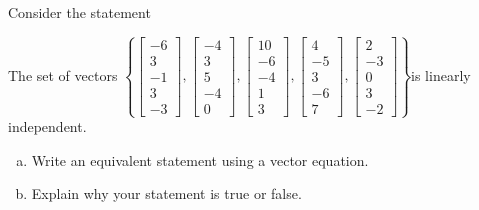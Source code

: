 
\begin{exerciseStatement}


Consider the statement 
\begin{center}\begin{minipage}{0.8\textwidth}
 The set of vectors \( \left\{ \left[\begin{array}{c}
-6 \\
3 \\
-1 \\
3 \\
-3
\end{array}\right] , \left[\begin{array}{c}
-4 \\
3 \\
5 \\
-4 \\
0
\end{array}\right] , \left[\begin{array}{c}
10 \\
-6 \\
-4 \\
1 \\
3
\end{array}\right] , \left[\begin{array}{c}
4 \\
-5 \\
3 \\
-6 \\
7
\end{array}\right] , \left[\begin{array}{c}
2 \\
-3 \\
0 \\
3 \\
-2
\end{array}\right] \right\} \)is linearly independent.
\end{minipage}\end{center}
    


\begin{enumerate}[(a)]
\item  Write an equivalent statement using a vector equation.
\item  Explain why your statement is true or false.
\end{enumerate}
    
\end{exerciseStatement}
    
